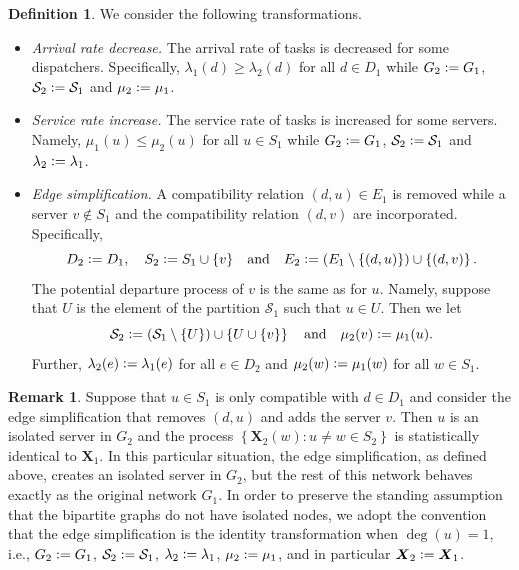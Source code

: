 \documentclass[a4paper, 12pt]{article}
\theoremstyle{definition}
\newtheorem{definition}{Definition}
\newtheorem{remark}{Remark}
\newcommand{\set}[2]{\left\{#1 : #2\right\}}
\newcommand{\defeq}{\vcentcolon=}
\newcommand{\bX}{\boldsymbol{X}}
\newcommand{\calS}{\mathcal{S}}
\begin{document}
\begin{definition}
	\label{def: monotone transformations}
	We consider the following transformations.
	\begin{itemize}
		\item \textit{Arrival rate decrease.} The arrival rate of tasks is decreased for some dispatchers. Specifically, $\lambda_1(d) \geq \lambda_2(d)$ for all $d \in D_1$ while $G_2 \defeq G_1$, $\calS_2 \defeq \calS_1$ and $\mu_2 \defeq \mu_1$.
		
		\item \textit{Service rate increase.} The service rate of tasks is increased for some servers. Namely, $\mu_1(u) \leq \mu_2(u)$ for all $u \in S_1$ while $G_2 \defeq G_1$, $\calS_2 \defeq \calS_1$ and $\lambda_2 \defeq \lambda_1$.
		
		\item \textit{Edge simplification.} A compatibility relation $(d, u) \in E_1$ is removed while a server $v \notin S_1$ and the compatibility relation $(d, v)$ are incorporated. Specifically,
		\begin{equation*}
			D_2 \defeq D_1, \quad S_2 \defeq S_1 \cup \{v\} \quad \text{and} \quad E_2 \defeq \left(E_1 \setminus \left\{(d, u)\right\}\right) \cup \left\{(d, v)\right\}.
		\end{equation*}
		The potential departure process of $v$ is the same as for $u$. Namely, suppose that $U$ is the element of the partition $\calS_1$ such that $u \in U$. Then we let
		\begin{equation*}
			\calS_2 \defeq \left(\calS_1 \setminus \left\{U\right\}\right) \cup \left\{U \cup \{v\}\right\} \quad \text{and} \quad \mu_2(v) \defeq \mu_1(u).
		\end{equation*}
		Further, $\lambda_2(e) \defeq \lambda_1(e)$ for all $e \in D_2$ and $\mu_2(w) \defeq \mu_1(w)$ for all $w \in S_1$.
	\end{itemize}
\end{definition}

\begin{remark}
	\label{rem: edge simplification that creates isolated servers}
	Suppose that $u \in S_1$ is only compatible with $d \in D_1$ and consider the edge simplification that removes $(d, u)$ and adds the server $v$. Then $u$ is an isolated server in $G_2$ and the process $\set{\bX_2(w)}{u \neq w \in S_2}$ is statistically identical to $\bX_1$. In this particular situation, the edge simplification, as defined above, creates an isolated server in $G_2$, but the rest of this network behaves exactly as the original network $G_1$. In order to preserve the standing assumption that the bipartite graphs do not have isolated nodes, we adopt the convention that the edge simplification is the identity transformation when $\deg(u) = 1$, i.e., $G_2 \defeq G_1$, $\calS_2 \defeq \calS_1$, $\lambda_2 \defeq \lambda_1$, $\mu_2 \defeq \mu_1$, and in particular $\bX_2 \defeq \bX_1$.
\end{remark}
\end{document}
